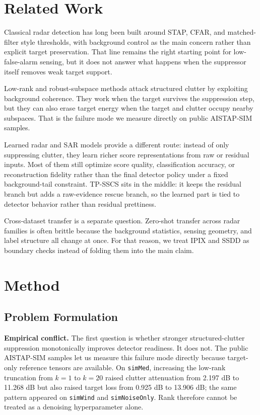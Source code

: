 \documentclass[journal]{IEEEtran}
\begin{document}
\section{Related Work}

Classical radar detection has long been built around STAP, CFAR, and matched-filter style thresholds, with background control as the main concern rather than explicit target preservation. That line remains the right starting point for low-false-alarm sensing, but it does not answer what happens when the suppressor itself removes weak target support.

Low-rank and robust-subspace methods attack structured clutter by exploiting background coherence. They work when the target survives the suppression step, but they can also erase target energy when the target and clutter occupy nearby subspaces. That is the failure mode we measure directly on public AISTAP-SIM samples.

Learned radar and SAR models provide a different route: instead of only suppressing clutter, they learn richer score representations from raw or residual inputs. Most of them still optimize score quality, classification accuracy, or reconstruction fidelity rather than the final detector policy under a fixed background-tail constraint. TP-SSCS sits in the middle: it keeps the residual branch but adds a raw-evidence rescue branch, so the learned part is tied to detector behavior rather than residual prettiness.

Cross-dataset transfer is a separate question. Zero-shot transfer across radar families is often brittle because the background statistics, sensing geometry, and label structure all change at once. For that reason, we treat IPIX and SSDD as boundary checks instead of folding them into the main claim.

\section{Method}

\subsection{Problem Formulation}

\noindent\textbf{Empirical conflict.} The first question is whether stronger structured-clutter suppression monotonically improves detector readiness. It does not. The public AISTAP-SIM samples let us measure this failure mode directly because target-only reference tensors are available. On \texttt{simMed}, increasing the low-rank truncation from $k=1$ to $k=20$ raised clutter attenuation from 2.197 dB to 11.268 dB but also raised target loss from 0.925 dB to 13.906 dB; the same pattern appeared on \texttt{simWind} and \texttt{simNoiseOnly}. Rank therefore cannot be treated as a denoising hyperparameter alone.
\end{document}

